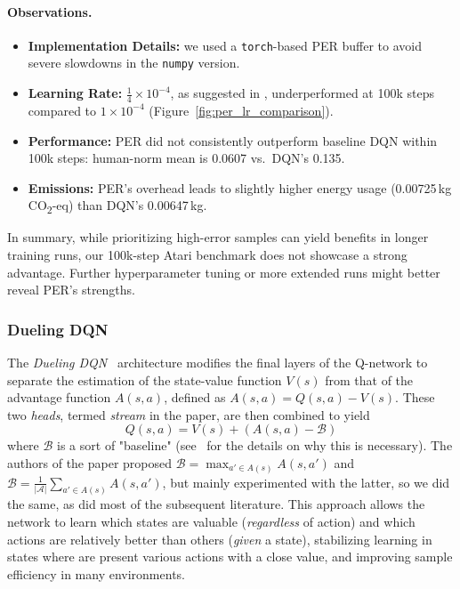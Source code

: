 \paragraph{Observations.}
\begin{itemize}
	\item \textbf{Implementation Details:} 
	we used a \texttt{torch}-based PER buffer to avoid severe slowdowns in the \texttt{numpy} version.
	\item \textbf{Learning Rate:} 
	$\tfrac{1}{4}\times10^{-4}$, as suggested in \cite{schaul:prioritized}, underperformed at 100k steps 
	compared to $1\times10^{-4}$ (Figure~\vref{fig:per_lr_comparison}).
	\item \textbf{Performance:} 
	PER did not consistently outperform baseline DQN within 100k steps: 
	human-norm mean is 0.0607 vs.\ DQN’s 0.135. 
	\item \textbf{Emissions:} 
	PER's overhead leads to slightly higher energy usage (0.00725\,kg CO\textsubscript{2}-eq) than DQN’s 0.00647\,kg.
\end{itemize}

In summary, while prioritizing high-error samples can yield benefits in longer training runs, 
our 100k-step Atari benchmark does not showcase a strong advantage. 
Further hyperparameter tuning or more extended runs might better reveal PER’s strengths.


\subsubsection{Dueling DQN}
\label{subsubsec:dueling_dqn}
The \emph{Dueling DQN}~\cite{wang:dueling} architecture modifies the final layers of the Q-network
to separate the estimation of the state-value function $V(s)$ from that of the advantage function $A(s,a)$,
defined as $A(s, a) = Q(s, a) - V(s)$.
These two \textit{heads}, termed \textit{stream} in the paper, are then combined to yield
$$
Q(s, a) = V(s) + (A(s, a) - \mathcal{B})
$$
where $\mathcal{B}$ is a sort of "baseline" (see~\cite{wang:dueling} for the details on why this is necessary). The authors of the paper proposed $\mathcal{B} = \max_{a' \in A(s)} A(s, a')$ and $\mathcal{B} = \frac{1}{|\mathcal{A}|}\sum_{a' \in A(s)} A(s, a')$, but mainly experimented with the latter, so we did the same, as did most of the subsequent literature.
This approach allows the network to learn which states are valuable 
(\emph{regardless} of action) and which actions are relatively better than others 
(\emph{given} a state), stabilizing learning in states where are present various actions with a close value, and improving sample efficiency 
in many environments.

